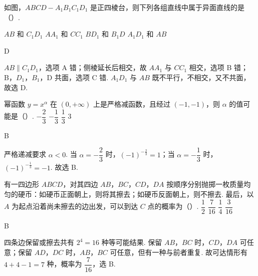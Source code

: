 \documentclass[UTF8,a4paper,oneside,11pt]{ctexbook}
\begin{document}
\begin{problem}
如图，\(ABCD-A_1B_1C_1D_1\) 是正四棱台，则下列各组直线中属于异面直线的是（\quad）.

\choices
    {\(AB\) 和 \(C_1D_1\)}
    {\(AA_1\) 和 \(CC_1\)}
    {\(BD_1\) 和 \(B_1D\)}
    {\(A_1D_1\) 和 \(AB\)}
\end{problem}

\begin{answer}
D
\end{answer}

\begin{solution}
\(AB\parallel C_1D_1\)，选项 A 错；侧棱延长后相交，故 \(AA_1\) 与 \(CC_1\) 相交，选项 B 错；B，\(D_1\)，\(B_1\)，D 共面，选项 C 错. \(A_1D_1\) 与 \(AB\) 既不平行，不相交，又不共面，故选 D.
\end{solution}

\begin{problem}
幂函数 \(y=x^\alpha\) 在 \((0,+\infty)\) 上是严格减函数，且经过 \((-1,-1)\)，则 \(\alpha\) 的值可能是（\quad）.
\choices
    {\(-\dfrac23\)}
    {\(-\dfrac13\)}
    {\(\dfrac13\)}
    {\(3\)}
\end{problem}

\begin{answer}
B
\end{answer}

\begin{solution}
严格递减要求 \(\alpha<0\). 当 \(\alpha=-\dfrac23\) 时，\((-1)^{-\frac{2}{3}}=1\)；当 \(\alpha=-\dfrac13\) 时，\((-1)^{-\frac{1}{3}}=-1\). 故选 B.
\end{solution}

\begin{problem}
有一四边形 \(ABCD\)，对其四边 \(AB\)，\(BC\)，\(CD\)，\(DA\) 按顺序分别抛掷一枚质量均匀的硬币：如硬币正面朝上，则将其擦去；如硬币反面朝上，则不擦去. 最后，以 \(A\) 为起点沿着尚未擦去的边出发，可以到达 \(C\) 点的概率为（\quad）.
\choices
    {\(\dfrac12\)}
    {\(\dfrac7{16}\)}
    {\(\dfrac14\)}
    {\(\dfrac3{16}\)}
\end{problem}

\begin{answer}
B
\end{answer}

\begin{solution}
四条边保留或擦去共有 \(2^4=16\) 种等可能结果. 保留 \(AB\)，\(BC\) 时，\(CD\)，\(DA\) 可任意；保留 \(AD\)，\(DC\) 时，\(AB\)，\(BC\) 可任意，但有一种与前者重复. 故可达情形有 \(4+4-1=7\) 种，概率为 \(\dfrac7{16}\)，选 B.
\end{solution}
\end{document}
